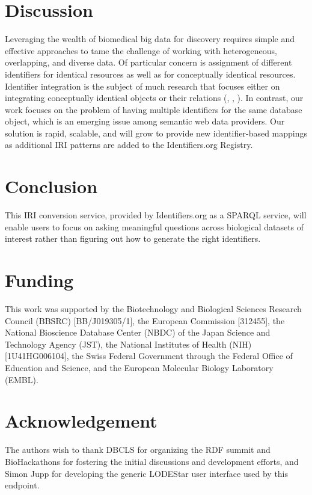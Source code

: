 \documentclass{bioinfo}
\begin{document}
\section{Discussion}
Leveraging the wealth of biomedical big data for discovery requires simple and effective approaches to tame the challenge of working with heterogeneous, overlapping, and diverse data. Of particular concern is assignment of different identifiers for identical resources as well as for conceptually identical resources. Identifier integration is the subject of much research that focuses either on integrating conceptually identical objects or their relations (\cite{VanIersel2010}, \cite{Wein2012}, \cite{Chambers2013}). In contrast, our work focuses on the problem of having multiple identifiers for the same database object, which is an emerging issue among semantic web data providers. Our solution is rapid, scalable, and will grow to provide new identifier-based mappings as additional IRI patterns are added to the Identifiers.org Registry.

\section{Conclusion}
This IRI conversion service, provided by Identifiers.org as a SPARQL service, will enable users to focus on asking meaningful questions across biological datasets of interest rather than figuring out how to generate the right identifiers.

\section{Funding} 
This work was supported by the Biotechnology and Biological Sciences Research Council (BBSRC) [BB/J019305/1], the European Commission [312455], the National Bioscience Database Center (NBDC) of the Japan Science and Technology Agency (JST), the National Institutes of Health (NIH) [1U41HG006104], the Swiss Federal Government through the Federal Office of Education and Science, and the European Molecular Biology Laboratory (EMBL).  

\section*{Acknowledgement}
The authors wish to thank DBCLS for organizing the RDF summit and BioHackathons for fostering the initial discussions and development efforts, and Simon Jupp for developing the generic LODEStar user interface used by this endpoint.


%
%
%
%
%
%
  
\end{document}
